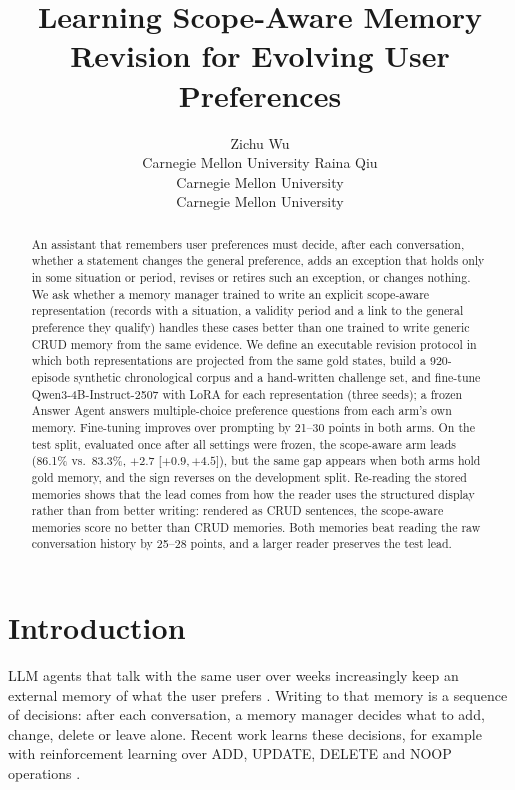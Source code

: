 \documentclass[11pt]{article}
\title{Learning Scope-Aware Memory Revision for Evolving User Preferences}
\author{Zichu Wu \\ Carnegie Mellon University \And
  Raina Qiu \\ Carnegie Mellon University \And
  \todo{third member} \\ Carnegie Mellon University}
\newcommand{\iv}[2]{[$#1$,\,$#2$]}
\begin{document}
\maketitle

\begin{abstract}
An assistant that remembers user preferences must decide, after each conversation, whether a statement changes the general preference, adds an exception that holds only in some situation or period, revises or retires such an exception, or changes nothing. We ask whether a memory manager trained to write an explicit scope-aware representation (records with a situation, a validity period and a link to the general preference they qualify) handles these cases better than one trained to write generic CRUD memory from the same evidence. We define an executable revision protocol in which both representations are projected from the same gold states, build a 920-episode synthetic chronological corpus and a hand-written challenge set, and fine-tune Qwen3-4B-Instruct-2507 with LoRA for each representation (three seeds); a frozen Answer Agent answers multiple-choice preference questions from each arm's own memory. Fine-tuning improves over prompting by 21--30 points in both arms. On the test split, evaluated once after all settings were frozen, the scope-aware arm leads (86.1\% vs.\ 83.3\%, $+2.7$ \iv{+0.9}{+4.5}), but the same gap appears when both arms hold gold memory, and the sign reverses on the development split. Re-reading the stored memories shows that the lead comes from how the reader uses the structured display rather than from better writing: rendered as CRUD sentences, the scope-aware memories score no better than CRUD memories. Both memories beat reading the raw conversation history by 25--28 points, and a larger reader preserves the test lead.
\end{abstract}

\section{Introduction}

LLM agents that talk with the same user over weeks increasingly keep an external memory of what the user prefers \citep{packer2023memgpt,chhikara2025mem0,xu2025amem}. Writing to that memory is a sequence of decisions: after each conversation, a memory manager decides what to add, change, delete or leave alone. Recent work learns these decisions, for example with reinforcement learning over ADD, UPDATE, DELETE and NOOP operations \citep{yan-etal-2026-memory,ma-etal-2026-fine}.
\end{document}
